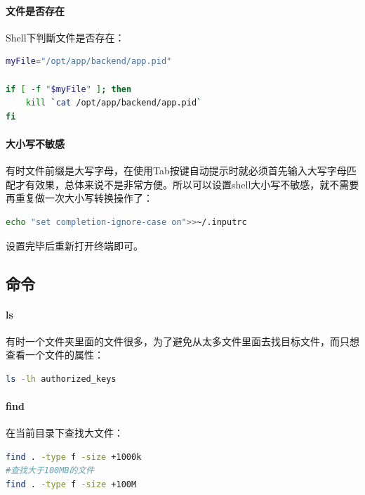 \documentclass[letter]{book}
\begin{document}
\paragraph{文件是否存在}

Shell下判斷文件是否存在：

\begin{lstlisting}[language=Bash]
myFile="/opt/app/backend/app.pid"

if [ -f "$myFile" ]; then
	kill `cat /opt/app/backend/app.pid`
fi
\end{lstlisting}

\paragraph{大小写不敏感}

有时文件前缀是大写字母，在使用Tab按键自动提示时就必须首先输入大写字母匹配才有效果，总体来说不是非常方便。所以可以设置shell大小写不敏感，就不需要再重复做一次大小写转换操作了：

\begin{lstlisting}[language=Bash]
echo "set completion-ignore-case on">>~/.inputrc
\end{lstlisting}

设置完毕后重新打开终端即可。

\subsection{命令}

\paragraph{ls}

有时一个文件夹里面的文件很多，为了避免从太多文件里面去找目标文件，而只想查看一个文件的属性：

\begin{lstlisting}[language=Bash]
ls -lh authorized_keys
\end{lstlisting}

\paragraph{find}

在当前目录下查找大文件：

\begin{lstlisting}[language=Bash]
find . -type f -size +1000k
#查找大于100MB的文件
find . -type f -size +100M
\end{lstlisting}
\end{document}
